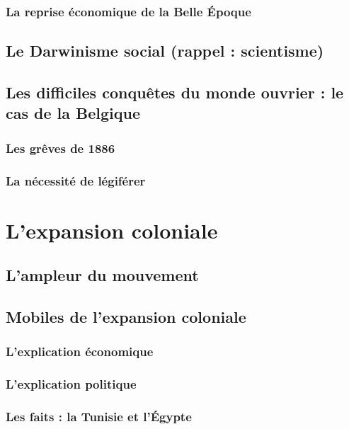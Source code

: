 \documentclass[12pt]{report}
\begin{document}
\subsubsection{La reprise économique de la Belle Époque}

\subsection{Le Darwinisme social (rappel : scientisme)}

\subsection{Les difficiles conquêtes du monde ouvrier : le cas de la Belgique}

\subsubsection{Les grêves de 1886}

\subsubsection{La nécessité de légiférer}

\section{L'expansion coloniale}

\subsection{L'ampleur du mouvement}

\subsection{Mobiles de l'expansion coloniale}

\subsubsection{L'explication économique}

\subsubsection{L'explication politique}

\subsubsection{Les faits : la Tunisie et l'Égypte}
\end{document}
